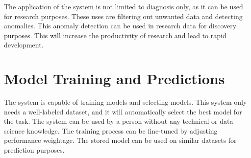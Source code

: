 The application of the system is not limited to diagnosis only, as it can be used for research purposes. These uses are filtering out unwanted data and detecting anomalies. This anomaly detection can be used in research data for discovery purposes. This will increase the productivity of research and lead to rapid development.

\section{Model Training and Predictions} \label{sec:model_training_and_predictions}
The system is capable of training models and selecting models. This system only needs a well-labeled dataset, and it will automatically select the best model for the task. The system can be used by a person without any technical or data science knowledge. The training process can be fine-tuned by adjusting performance weightage. The stored model can be used on similar datasets for prediction purposes.